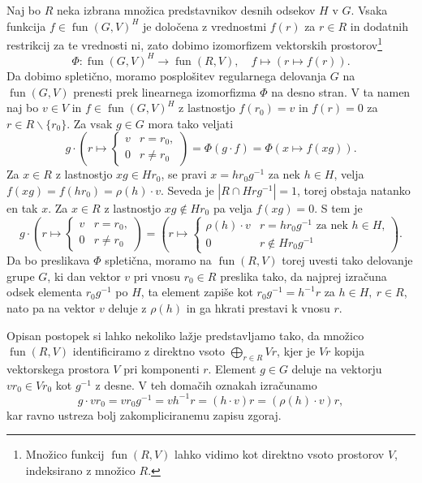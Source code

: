 \documentclass[11pt]{book}
\DeclareMathOperator\fun{fun}
\theoremstyle{definition}
\theoremstyle{zgled}
\theoremstyle{odprtproblem}
\theoremstyle{domacanaloga}
\theoremstyle{izrek}
\begin{document}
Naj bo $R$ neka izbrana množica predstavnikov desnih odsekov $H$ v $G$. Vsaka funkcija $f \in \fun(G,V)^H$ je določena z vrednostmi $f(r)$ za $r \in R$ in dodatnih restrikcij za te vrednosti ni, zato dobimo izomorfizem vektorskih prostorov\footnote{Množico funkcij $\fun(R,V)$ lahko vidimo kot direktno vsoto prostorov $V$, indeksirano z množico $R$.}
    \[
        \Phi \colon \fun(G,V)^H \to \fun(R,V), \quad
        f \mapsto \left( r \mapsto f(r) \right).
    \]
Da dobimo spletično, moramo posplošitev regularnega delovanja $G$ na $\fun(G,V)$ prenesti prek linearnega izomorfizma $\Phi$ na desno stran. V ta namen naj bo $v \in V$ in $f \in \fun(G,V)^H$ z lastnostjo $f(r_0) = v$ in $f(r) = 0$ za $r \in R \backslash \{ r_0 \}$. Za vsak $g \in G$ mora tako veljati
    \[
        g \cdot \left( r \mapsto \begin{cases} v & r = r_0, \\ 0 & r \neq r_0 \end{cases} \right) =
        \Phi \left( g \cdot f \right) =
        \Phi \left( x \mapsto f(xg) \right).
    \]
Za $x \in R$ z lastnostjo $xg \in Hr_0$, se pravi $x = h r_0 g^{-1}$ za nek $h \in H$, velja $f(xg) = f(hr_0) = \rho(h) \cdot v$. Seveda je $|R \cap H r g^{-1}| = 1$, torej obstaja natanko en tak $x$. Za $x \in R$ z lastnostjo $xg \notin Hr_0$ pa velja $f(xg) = 0$. S tem je
    \[
        g \cdot \left( r \mapsto \begin{cases} v & r = r_0, \\ 0 & r \neq r_0 \end{cases} \right) =
        \left( r \mapsto \begin{cases} \rho(h) \cdot v & r = h r_0 g^{-1} \text{ za nek $h \in H$,} \\ 0 & r \notin H r_0 g^{-1} \end{cases} \right).
    \]
Da bo preslikava $\Phi$ spletična, moramo na $\fun(R,V)$ torej uvesti tako delovanje grupe $G$, ki dan vektor $v$ pri vnosu $r_0 \in R$ preslika tako, da najprej izračuna odsek elementa $r_0 g^{-1}$ po $H$, ta element zapiše kot $r_0 g^{-1} = h^{-1} r$ za $h \in H, \ r \in R$, nato pa na vektor $v$ deluje z $\rho(h)$ in ga hkrati prestavi k vnosu $r$.
    
Opisan postopek si lahko nekoliko lažje predstavljamo tako, da množico $\fun(R,V)$ identificiramo z direktno vsoto $\bigoplus_{r \in R} V r$, kjer je $Vr$ kopija vektorskega prostora $V$ pri komponenti $r$. Element $g \in G$ deluje na vektorju $v r_0 \in Vr_0$ kot $g^{-1}$ z desne. V teh domačih oznakah izračunamo
    \[
        g \cdot v r_0 = v r_0 g^{-1} = v h^{-1} r = (h \cdot v) r = (\rho(h) \cdot v) r,
    \]
kar ravno ustreza bolj zakompliciranemu zapisu zgoraj.
\end{document}
